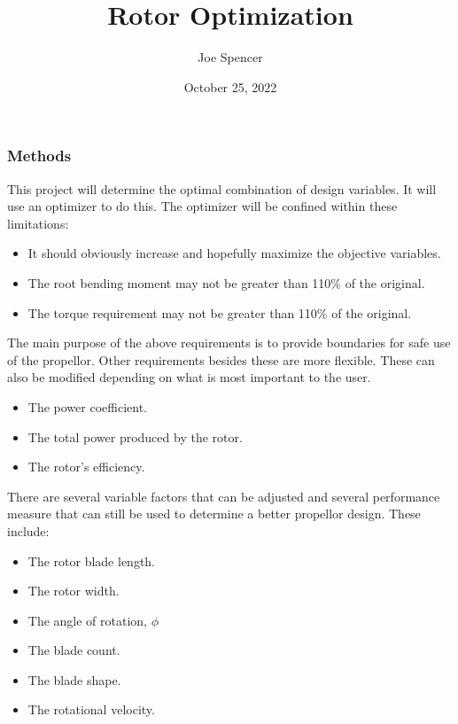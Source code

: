 \documentclass{article}
\begin{document}
\author{Joe Spencer}
\title{Rotor Optimization}
\date{October 25, 2022}
\maketitle

\subsubsection*{Methods}

This project will determine the optimal combination of design variables. It will use an optimizer to do this. The optimizer will be confined within these limitations:

\begin{itemize}
	\item It should obviously increase and hopefully maximize the objective variables.
	\item The root bending moment may not be greater than 110\% of the original.
	\item The torque requirement may not be greater than 110\% of the original.
\end{itemize}

The main purpose of the above requirements is to provide boundaries for safe use of the propellor. Other requirements besides these are more flexible. These can also be modified depending on what is most important to the user.

\begin{itemize}
	\item The power coefficient.
	\item The total power produced by the rotor.
	\item The rotor's efficiency.
\end{itemize}

There are several variable factors that can be adjusted and several performance measure that can still be used to determine a better propellor design. These include:

\begin{itemize}
	\item The rotor blade length.
	\item The rotor width.
	\item The angle of rotation, $\phi$
	\item The blade count.
	\item The blade shape.
	\item The rotational velocity.
\end{itemize}
\end{document}
